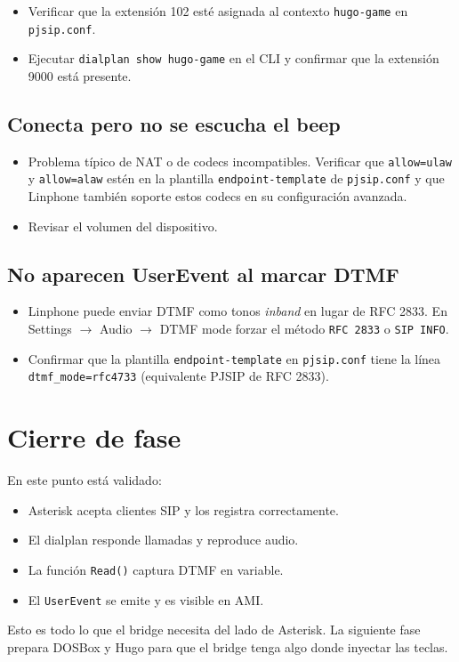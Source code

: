 \begin{itemize}
  \item Verificar que la extensión 102 esté asignada al contexto \texttt{hugo-game} en \texttt{pjsip.conf}.
  \item Ejecutar \texttt{dialplan show hugo-game} en el CLI y confirmar que la extensión 9000 está presente.
\end{itemize}

\subsection{Conecta pero no se escucha el beep}

\begin{itemize}
  \item Problema típico de NAT o de codecs incompatibles. Verificar que \texttt{allow=ulaw} y \texttt{allow=alaw} estén en la plantilla \texttt{endpoint-template} de \texttt{pjsip.conf} y que Linphone también soporte estos codecs en su configuración avanzada.
  \item Revisar el volumen del dispositivo.
\end{itemize}

\subsection{No aparecen UserEvent al marcar DTMF}

\begin{itemize}
  \item Linphone puede enviar DTMF como tonos \emph{inband} en lugar de RFC 2833. En \textsf{Settings} $\to$ \textsf{Audio} $\to$ \textsf{DTMF mode} forzar el método \texttt{RFC 2833} o \texttt{SIP INFO}.
  \item Confirmar que la plantilla \texttt{endpoint-template} en \texttt{pjsip.conf} tiene la línea \texttt{dtmf\_mode=rfc4733} (equivalente PJSIP de RFC 2833).
\end{itemize}

\section{Cierre de fase}

En este punto está validado:

\begin{itemize}
  \item Asterisk acepta clientes SIP y los registra correctamente.
  \item El dialplan responde llamadas y reproduce audio.
  \item La función \texttt{Read()} captura DTMF en variable.
  \item El \texttt{UserEvent} se emite y es visible en AMI.
\end{itemize}

Esto es todo lo que el bridge necesita del lado de Asterisk. La siguiente fase prepara DOSBox y Hugo para que el bridge tenga algo donde inyectar las teclas.
